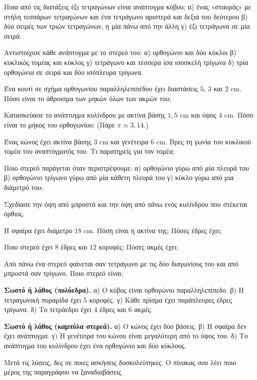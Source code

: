 \ex Ποια από τις διατάξεις έξι τετραγώνων είναι ανάπτυγμα κύβου; α) ένας «σταυρός» με στήλη τεσσάρων τετραγώνων και ένα τετράγωνο αριστερά και δεξιά του δεύτερου \quad β) δύο σειρές των τριών τετραγώνων, η μία πάνω από την άλλη \quad γ) έξι τετράγωνα σε μία σειρά.

\ex Αντιστοίχισε κάθε ανάπτυγμα με το στερεό του: α) ορθογώνιο και δύο κύκλοι \quad β) κυκλικός τομέας και κύκλος \quad γ) τετράγωνο και τέσσερα ίσα ισοσκελή τρίγωνα \quad δ) τρία ορθογώνια σε σειρά και δύο ισόπλευρα τρίγωνα.

\ex Ένα κουτί σε σχήμα ορθογωνίου παραλληλεπιπέδου έχει διαστάσεις $5$, $3$ και $2$ cm. Πόσο είναι το άθροισμα των μηκών όλων των ακμών του;

\ex Κατασκεύασε το ανάπτυγμα κυλίνδρου με ακτίνα βάσης $1{,}5$ cm και ύψος $4$ cm. Πόσο είναι το μήκος του ορθογωνίου; (Πάρε $\pi\approx3{,}14$.)

\ex Ένας κώνος έχει ακτίνα βάσης $3$ cm και γενέτειρα $6$ cm. Βρες τη γωνία του κυκλικού τομέα του αναπτύγματός του. Τι παρατηρείς για τον τομέα;

\ex Ποιο στερεό παράγεται όταν περιστρέψουμε: α) ορθογώνιο γύρω από μία πλευρά του \quad β) ορθογώνιο τρίγωνο γύρω από μία κάθετη πλευρά του \quad γ) κύκλο γύρω από μια διάμετρό του;

\ex Σχεδίασε την όψη από μπροστά και την όψη από πάνω ενός κυλίνδρου που στέκεται όρθιος.

\ex Η σφαίρα έχει διάμετρο $18$ cm. Πόση είναι η ακτίνα της; Πόσες έδρες έχει;

\ex Ποιο στερεό έχει $8$ έδρες και $12$ κορυφές; Πόσες ακμές έχει;

\ex Από πάνω ένα στερεό φαίνεται σαν τετράγωνο με τις δύο διαγωνίους του και από μπροστά σαν τρίγωνο. Ποιο στερεό είναι;

\ex \textbf{Σωστό ή λάθος (πολύεδρα).} α) Ο κύβος είναι ορθογώνιο παραλληλεπίπεδο. \quad β) Η τετραγωνική πυραμίδα έχει $5$ κορυφές. \quad γ) Κάθε πρίσμα έχει παράπλευρες έδρες τρίγωνα. \quad δ) Το τετράεδρο έχει $4$ έδρες και $6$ ακμές.

\ex \textbf{Σωστό ή λάθος (καμπύλα στερεά).} α) Ο κώνος έχει δύο βάσεις. \quad β) Η σφαίρα δεν έχει ανάπτυγμα. \quad γ) Η γενέτειρα του κώνου είναι μεγαλύτερη από το ύψος του. \quad δ) Το ανάπτυγμα του κυλίνδρου έχει ένα ορθογώνιο και δύο κύκλους.


Μετά τις λύσεις, δες σε ποιες ασκήσεις δυσκολεύτηκες. Ο πίνακας σου λέει ποιο μέρος της παραγράφου να ξαναδιαβάσεις.

